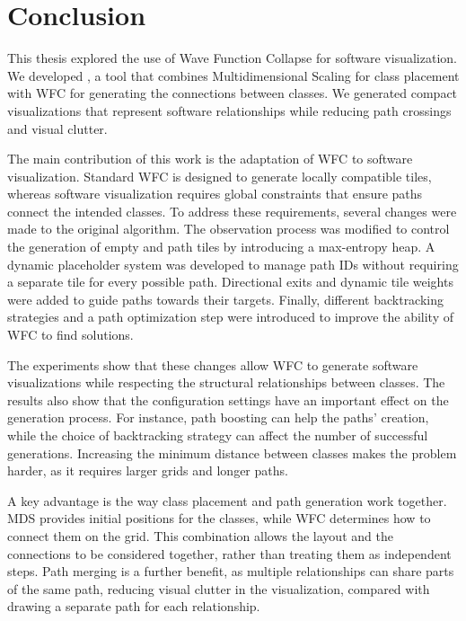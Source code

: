 \documentclass[../main.tex]{subfiles}
\begin{document}
\chapter{Conclusion}
\label{chap:conclusion}

This thesis explored the use of Wave Function Collapse for software visualization. We developed \wassis, a tool that combines Multidimensional Scaling for class placement with WFC for generating the connections between classes. We generated compact visualizations that represent software relationships while reducing path crossings and visual clutter.

The main contribution of this work is the adaptation of WFC to software visualization. Standard WFC is designed to generate locally compatible tiles, whereas software visualization requires global constraints that ensure paths connect the intended classes. To address these requirements, several changes were made to the original algorithm. The observation process was modified to control the generation of empty and path tiles by introducing a max-entropy heap. A dynamic placeholder system was developed to manage path IDs without requiring a separate tile for every possible path. Directional exits and dynamic tile weights were added to guide paths towards their targets. Finally, different backtracking strategies and a path optimization step were introduced to improve the ability of WFC to find solutions.

The experiments show that these changes allow WFC to generate software visualizations while respecting the structural relationships between classes. The results also show that the configuration settings have an important effect on the generation process. For instance, path boosting can help the paths' creation, while the choice of backtracking strategy can affect the number of successful generations. Increasing the minimum distance between classes makes the problem harder, as it requires larger grids and longer paths. 

A key advantage is the way class placement and path generation work together. MDS provides initial positions for the classes, while WFC determines how to connect them on the grid. This combination allows the layout and the connections to be considered together, rather than treating them as independent steps. Path merging is a further benefit, as multiple relationships can share parts of the same path, reducing visual clutter in the visualization, compared with drawing a separate path for each relationship.
\end{document}
